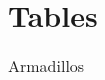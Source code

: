\chapter{Tables}

\begin{table}
\caption{Armadillos}
\label{arm:table}
\begin{center}
\begin{tabular}{||l|l||}\hline

\end{tabular}
\end{center}
\end{table}

\clearpage
\newpage
